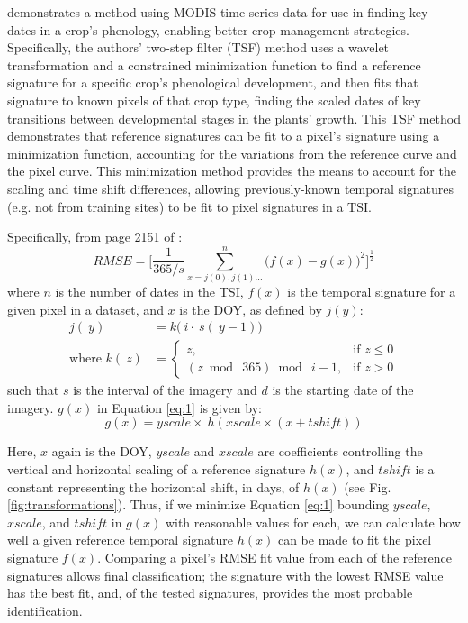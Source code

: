 \textcites{sakamoto2005a-crop}{sakamoto2010a-two-step} demonstrates a method using MODIS time-series data for use in finding key dates in a crop’s phenology, enabling better crop management strategies. Specifically, the authors’ two-step filter (TSF) method uses a wavelet transformation and a constrained minimization function to find a reference signature for a specific crop’s phenological development, and then fits that signature to known pixels of that crop type, finding the scaled dates of key transitions between developmental stages in the plants’ growth. This TSF method demonstrates that reference signatures can be fit to a pixel’s signature using a minimization function, accounting for the variations from the reference curve and the pixel curve.  This minimization method provides the means to account for the scaling and time shift differences, allowing previously-known temporal signatures (e.g. not from training sites) to be fit to pixel signatures in a TSI.

Specifically, from page 2151 of \textcite{sakamoto2010a-two-step}:
\begin{equation}
\label{eq:1}
  RMSE = \biggl[\frac{1}{365/s}\sum_{x=j(0), j(1)…}^{n}\bigl(f\left(x\right)-g\left(x\right)\bigr)^{2}\biggr]^{\frac{1}{2}}
\end{equation}
where $n$ is the number of dates in the TSI, $f(x)$ is the temporal signature for a given pixel in a dataset, and $x$ is the DOY, as defined by $j(y)$:
\begin{subequations}
\label{eq:DOYcalc}
  \begin{align}
    j\left(~y\right) &= k\bigl(~i\cdot~s\left(~y - 1\right)\bigr) \label{eq:jofy}\\
    \text{where\ \ \ \ } k\left(~z\right) &=
    \begin{cases}
      z, & \mbox{if } z \leq 0\\
      \left(z\bmod~365\right)\bmod~i-1, & \mbox{if } z > 0
    \end{cases} \label{eq:kofz}
  \end{align}
\end{subequations}
such that $s$ is the interval of the imagery and $d$ is the starting date of the imagery. $g(x)$ in Equation \ref{eq:1} is given by:
\begin{equation}
\label{eq:gofx}
  g(x) = yscale\times~h\left(xscale\times(x + tshift)\right)
\end{equation}

Here, $x$ again is the DOY, $yscale$ and  $xscale$ are coefficients controlling the vertical and horizontal scaling of a reference signature $h(x)$, and $tshift$ is a constant representing the horizontal shift, in days, of $h(x)$ (see Fig. \ref{fig:transformations}). Thus, if we minimize Equation \ref{eq:1} bounding $yscale$, $xscale$, and $tshift$  in $g(x)$ with reasonable values for each, we can calculate how well a given reference temporal signature $h(x)$ can be made to fit the pixel signature $f(x)$. Comparing a pixel's RMSE fit value from each of the reference signatures allows final classification; the signature with the lowest RMSE value has the best fit, and, of the tested signatures, provides the most probable identification.


